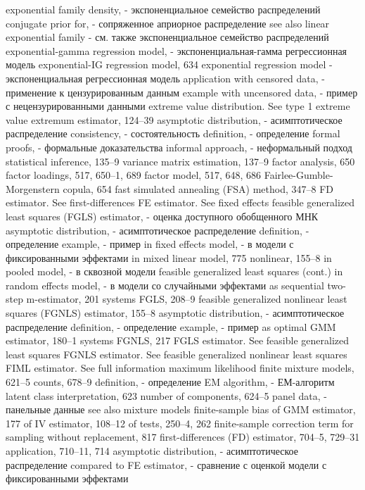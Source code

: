 exponential family density, - экспоненциальное семейство распределений 
conjugate prior for, - сопряженное априорное распределение
see also linear exponential family - см. также экспоненциальное семейство распределений
exponential-gamma regression model, - экспоненциальная-гамма регрессионная модель
exponential-IG regression model, 634 
exponential regression model - экспоненциальная регрессионная модель
application with censored data, - применение к цензурированным данным
example with uncensored data, - пример с нецензурированными данными
extreme value distribution. See type 1 extreme value extremum estimator, 124–39
asymptotic distribution, - асимптотическое распределение 
consistency, - состоятельность
definition, - определение
formal proofs, - формальные доказательства
informal approach, - неформальный подход 
statistical inference, 135–9 variance matrix estimation, 137–9
factor analysis, 650
factor loadings, 517, 650–1, 689
factor model, 517, 648, 686 Fairlee-Gumble-Morgenstern copula, 654
fast simulated annealing (FSA) method, 347–8
FD estimator. See first-differences
FE estimator. See fixed effects
feasible generalized least squares (FGLS) estimator, - оценка доступного обобщенного МНК
asymptotic distribution, - асимптотическое распределение 
definition, - определение
example, - пример
in fixed effects model, - в модели с фиксированными эффектами 
in mixed linear model, 775 nonlinear, 155–8
in pooled model, - в сквозной модели
feasible generalized least squares (cont.)
in random effects model, - в модели со случайными эффектами
as sequential two-step m-estimator, 201 systems FGLS, 208–9
feasible generalized nonlinear least squares (FGNLS) estimator, 155–8
asymptotic distribution, - асимптотическое распределение 
definition, - определение
example, - пример
as optimal GMM estimator, 180–1 systems FGNLS, 217
FGLS estimator. See feasible generalized least squares FGNLS estimator. See feasible generalized nonlinear
least squares
FIML estimator. See full information maximum
likelihood
finite mixture models, 621–5
counts, 678–9
definition, - определение
EM algorithm, - ЕМ-алгоритм
latent class interpretation, 623 number of components, 624–5 
panel data, - панельные данные
see also mixture models
finite-sample bias
of GMM estimator, 177 of IV estimator, 108–12 of tests, 250–4, 262
finite-sample correction term
for sampling without replacement, 817
first-differences (FD) estimator, 704–5, 729–31 application, 710–11, 714
asymptotic distribution, - асимптотическое распределение
compared to FE estimator, - сравнение с оценкой модели с фиксированными эффектами
